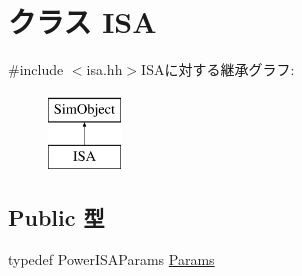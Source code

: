 \hypertarget{classPowerISA_1_1ISA}{
\section{クラス ISA}
\label{classPowerISA_1_1ISA}
}


{\ttfamily \#include $<$isa.hh$>$}ISAに対する継承グラフ:\begin{figure}[H]
\begin{center}
\leavevmode
\includegraphics[height=2cm]{classPowerISA_1_1ISA}
\end{center}
\end{figure}
\subsection*{Public 型}
\begin{DoxyCompactItemize}
\item 
typedef PowerISAParams \hyperlink{classPowerISA_1_1ISA_aa026c2a3d58faf0c2fdd7af027f1cf55}{Params}
\end{DoxyCompactItemize}
